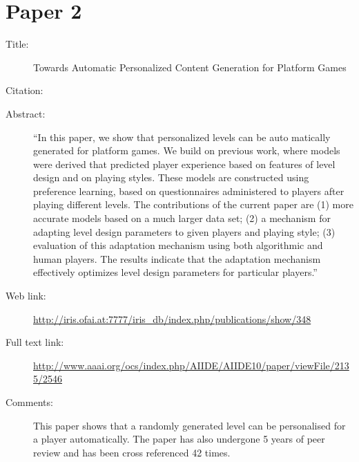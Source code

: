 \documentclass{scrartcl}
\begin{document}
\section*{Paper 2}
\begin{description}
\item[Title:] Towards Automatic Personalized Content Generation for Platform Games
\item[Citation:] \cite{Shaker}
\item[Abstract:] ``In this paper, we show that personalized levels can be auto
matically generated for platform games.  We build on previous work, where models were derived that predicted player experience based on features of level design and on playing styles.  These models are constructed using preference learning,  based  on  questionnaires  administered  to  players after playing different levels.  The contributions of the current paper are (1) more accurate models based on a much larger data set; (2) a mechanism for adapting level design parameters to given players and playing style; (3) evaluation of this adaptation mechanism using both algorithmic and human players. The results indicate that the adaptation mechanism effectively optimizes level design parameters for particular players.''
\item[Web link:] \url{http://iris.ofai.at:7777/iris_db/index.php/publications/show/348}
\item[Full text link:] \url{http://www.aaai.org/ocs/index.php/AIIDE/AIIDE10/paper/viewFile/2135/2546}
\item[Comments:] This paper shows that a randomly generated level can be personalised for a player automatically. The paper has also undergone 5 years of peer review and has been cross referenced 42 times.
\end{description}
\end{document}
